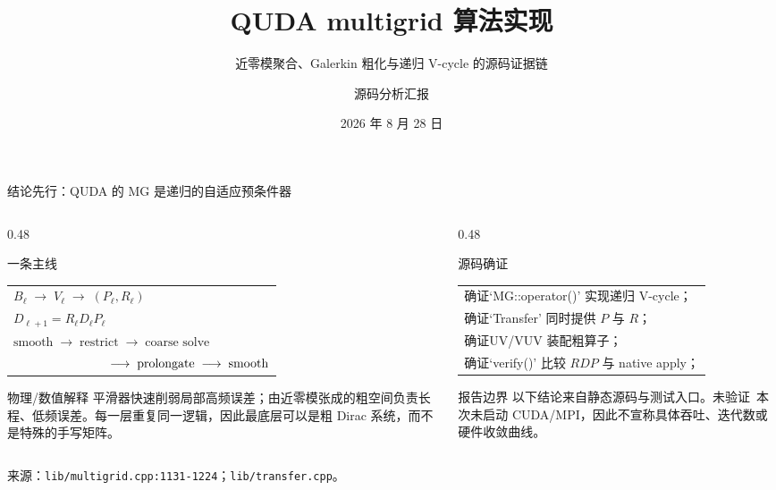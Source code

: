 \documentclass[UTF8,aspectratio=169,11pt]{ctexbeamer}
\title[QUDA multigrid]{QUDA multigrid 算法实现}
\subtitle{近零模聚合、Galerkin 粗化与递归 V-cycle 的源码证据链}
\author[源码分析汇报]{源码分析汇报}
\institute{QUDA 1.1.0 参考源码快照}
\date{2026 年 8 月 28 日}
\newcommand{\source}[1]{\vspace{0.04em}\par\noindent\parbox[t]{0.96\linewidth}{\raggedright\tiny\color{muted}来源：#1\par}}
\newcommand{\verified}{\textcolor{evidence}{确证}}
\newcommand{\unverified}{\textcolor{warning}{未验证}}
\newcommand{\codepath}[1]{\nolinkurl{#1}}
\begin{document}
\begin{frame}[plain]
  \titlepage
\end{frame}

\begin{frame}[t]{结论先行：QUDA 的 MG 是递归的自适应预条件器}
  \small
  \begin{columns}[T,totalwidth=\textwidth]
    \begin{column}{0.48\textwidth}
      \begin{block}{一条主线}
        \begin{tabular}{@{}l@{}}
          $B_\ell\;\longrightarrow\;V_\ell\;\longrightarrow\;(P_\ell,R_\ell)$ \\
          $D_{\ell+1}=R_\ell D_\ell P_\ell$ \\
          $\text{smooth}\;\longrightarrow\;\text{restrict}\;\longrightarrow\;\text{coarse solve}$ \\
          $\hspace{2.7cm}\longrightarrow\;\text{prolongate}\;\longrightarrow\;\text{smooth}$
        \end{tabular}
      \end{block}
      \begin{block}{物理/数值解释}
        平滑器快速削弱局部高频误差；由近零模张成的粗空间负责长程、低频误差。每一层重复同一逻辑，因此最底层可以是粗 Dirac 系统，而不是特殊的手写矩阵。
      \end{block}
    \end{column}
    \begin{column}{0.48\textwidth}
      \begin{block}{源码确证}
        \begin{tabular}{@{}l@{}}
          \verified\quad `MG::operator()' 实现递归 V-cycle；\\
          \verified\quad `Transfer' 同时提供 $P$ 与 $R$；\\
          \verified\quad UV/VUV 装配粗算子；\\
          \verified\quad `verify()' 比较 $RDP$ 与 native apply；
        \end{tabular}
      \end{block}
      \begin{alertblock}{报告边界}
        以下结论来自静态源码与测试入口。\unverified\ 本次未启动 CUDA/MPI，因此不宣称具体吞吐、迭代数或硬件收敛曲线。
      \end{alertblock}
    \end{column}
  \end{columns}
  \vfill
  \begin{center}
  \end{center}
  \vspace{-0.05cm}
  \source{\codepath{lib/multigrid.cpp:1131-1224}；\codepath{lib/transfer.cpp}。}
\end{frame}
\end{document}
